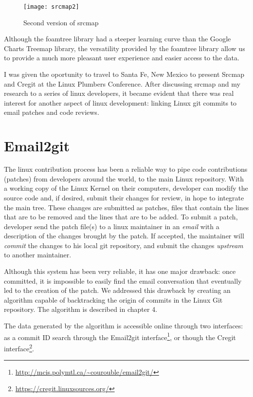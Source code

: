 \begin{figure}[htb]
\centering
\texttt{[image: srcmap2]}
\caption{Second version of srcmap}
\label{fig:srcmap2}
\end{figure}

Although the foamtree library had a steeper learning curve than the Google Charts Treemap library, the versatility provided by the foamtree library allow us to provide a much more pleasant user experience and easier access to the data.

I was given the oportunity to travel to Santa Fe, New Mexico to present Srcmap and Cregit at the Linux Plumbers Conference. After discussing srcmap and my research to a series of linux developers, it became evident that there was real interest for another aspect of linux development: linking Linux git commits to email patches and code reviews.


\section{Email2git}

The linux contribution process has been a reliable way to pipe code contributions (patches) from developers around the world, to the main Linux repository. With a working copy of the Linux Kernel on their computers, developer can modify the source code and, if desired, submit their changes for review, in hope to integrate the main tree. These changes are submitted as patches, files that contain the lines that are to be removed and the lines that are to be added. To submit a patch, developer send the patch file(s) to a linux maintainer in an \textit{email} with a description of the changes brought by the patch. If accepted, the maintainer will \textit{commit} the changes to his local git repository, and submit the changes \textit{upstream} to another maintainer. 

Although this system has been very reliable, it has one major drawback: once committed, it is impossible to easily find the email conversation that eventually led to the creation of the patch. We addressed this drawback by creating an algorithm capable of backtracking the origin of commits in the Linux Git repository. The algorithm is described in chapter 4.

The data generated by the algorithm is accessible online through two interfaces: as a commit ID search through the Email2git interface\footnote{\url{http://mcis.polymtl.ca/~courouble/email2git/}}, or though the Cregit interface\footnote{\url{https://cregit.linuxsources.org/}}.

